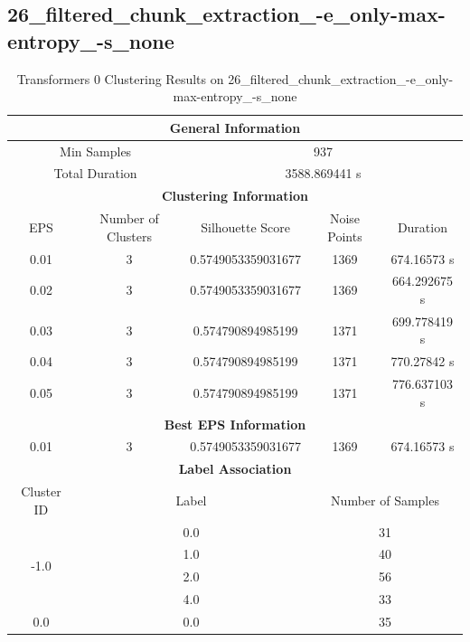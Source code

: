 \label{sec:annexe:clustering_results}

\subsection{26\_filtered\_chunk\_extraction\_-e\_only-max-entropy\_-s\_none}

\begin{longtable}{|c|c|c|c|c|}
\caption{Transformers 0 Clustering Results on 26\_filtered\_chunk\_extraction\_-e\_only-max-entropy\_-s\_none} \label{tab:26_filtered_chunk_extraction_-e_only-max-entropy_-s_none_transformers_0_clustering_results}\\
\hline
\multicolumn{5}{|c|}{\textbf{General Information}} \\
\hline
\multicolumn{2}{|c|}{Min Samples} & \multicolumn{3}{c|}{937} \\
\multicolumn{2}{|c|}{Total Duration} & \multicolumn{3}{c|}{3588.869441 s} \\
\hline
\multicolumn{5}{|c|}{\textbf{Clustering Information}} \\
\hline
EPS & Number of Clusters & Silhouette Score & Noise Points & Duration \\
0.01 & 3 & 0.5749053359031677 & 1369 & 674.16573 s\\
0.02 & 3 & 0.5749053359031677 & 1369 & 664.292675 s\\
0.03 & 3 & 0.574790894985199 & 1371 & 699.778419 s\\
0.04 & 3 & 0.574790894985199 & 1371 & 770.27842 s\\
0.05 & 3 & 0.574790894985199 & 1371 & 776.637103 s\\
\hline
\multicolumn{5}{|c|}{\textbf{Best EPS Information}} \\
\hline
0.01 & 3 & 0.5749053359031677 & 1369 & 674.16573 s\\
\hline
\multicolumn{5}{|c|}{\textbf{Label Association}} \\
\hline
Cluster ID & \multicolumn{2}{c|}{Label} & \multicolumn{2}{c|}{Number of Samples} \\
\hline
\multirow{4}{*}{-1.0} & \multicolumn{2}{c|}{0.0} & \multicolumn{2}{c|}{31} \\
& \multicolumn{2}{c|}{1.0} & \multicolumn{2}{c|}{40} \\
& \multicolumn{2}{c|}{2.0} & \multicolumn{2}{c|}{56} \\
& \multicolumn{2}{c|}{4.0} & \multicolumn{2}{c|}{33} \\
\hline
\multirow{4}{*}{0.0} & \multicolumn{2}{c|}{0.0} & \multicolumn{2}{c|}{35} \\

\end{longtable}
